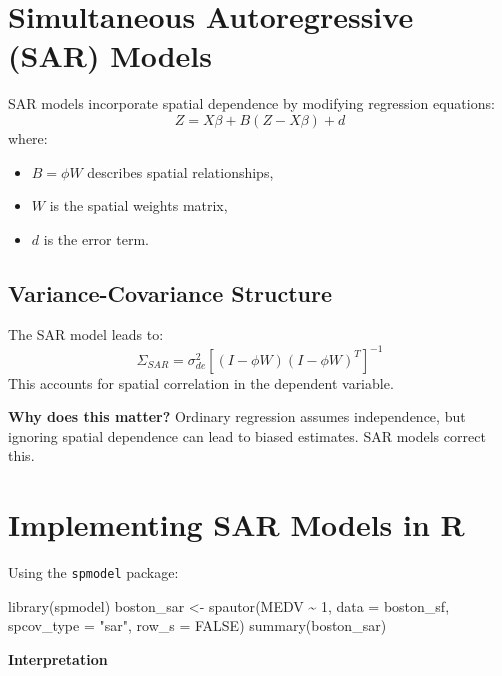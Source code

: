 \documentclass[
  11pt,
]{report}
\newenvironment{Shaded}{\begin{snugshade}}{\end{snugshade}}
\newcommand{\AttributeTok}[1]{\textcolor[rgb]{0.40,0.45,0.13}{#1}}
\newcommand{\ConstantTok}[1]{\textcolor[rgb]{0.56,0.35,0.01}{#1}}
\newcommand{\DecValTok}[1]{\textcolor[rgb]{0.68,0.00,0.00}{#1}}
\newcommand{\FunctionTok}[1]{\textcolor[rgb]{0.28,0.35,0.67}{#1}}
\newcommand{\NormalTok}[1]{\textcolor[rgb]{0.00,0.23,0.31}{#1}}
\newcommand{\OtherTok}[1]{\textcolor[rgb]{0.00,0.23,0.31}{#1}}
\newcommand{\SpecialCharTok}[1]{\textcolor[rgb]{0.37,0.37,0.37}{#1}}
\newcommand{\StringTok}[1]{\textcolor[rgb]{0.13,0.47,0.30}{#1}}
\providecommand{\tightlist}{%
  \setlength{\itemsep}{0pt}\setlength{\parskip}{0pt}}\usepackage{longtable,booktabs,array}
\begin{document}
\section{Simultaneous Autoregressive (SAR)
Models}\label{simultaneous-autoregressive-sar-models-1}

SAR models incorporate spatial dependence by modifying regression
equations: \[
Z = X\beta + B(Z - X\beta) + d
\] where:

\begin{itemize}
\tightlist
\item
  \(B = \phi W\) describes spatial relationships,
\item
  \(W\) is the spatial weights matrix,
\item
  \(d\) is the error term.
\end{itemize}

\subsection{Variance-Covariance
Structure}\label{variance-covariance-structure}

The SAR model leads to: \[
\Sigma_{SAR} = \sigma^2_{de} [(I - \phi W)(I - \phi W)^T]^{-1}
\] This accounts for spatial correlation in the dependent variable.

\textbf{Why does this matter?} Ordinary regression assumes independence,
but ignoring spatial dependence can lead to biased estimates. SAR models
correct this.

\section{Implementing SAR Models in
R}\label{implementing-sar-models-in-r}

Using the \texttt{spmodel} package:

\begin{Shaded}
\begin{Highlighting}[]
\FunctionTok{library}\NormalTok{(spmodel)}
\NormalTok{boston\_sar }\OtherTok{\textless{}{-}} \FunctionTok{spautor}\NormalTok{(MEDV }\SpecialCharTok{\textasciitilde{}} \DecValTok{1}\NormalTok{, }\AttributeTok{data =}\NormalTok{ boston\_sf, }\AttributeTok{spcov\_type =} \StringTok{"sar"}\NormalTok{, }\AttributeTok{row\_s =} \ConstantTok{FALSE}\NormalTok{)}
\FunctionTok{summary}\NormalTok{(boston\_sar)}
\end{Highlighting}
\end{Shaded}

\textbf{Interpretation}
\end{document}
